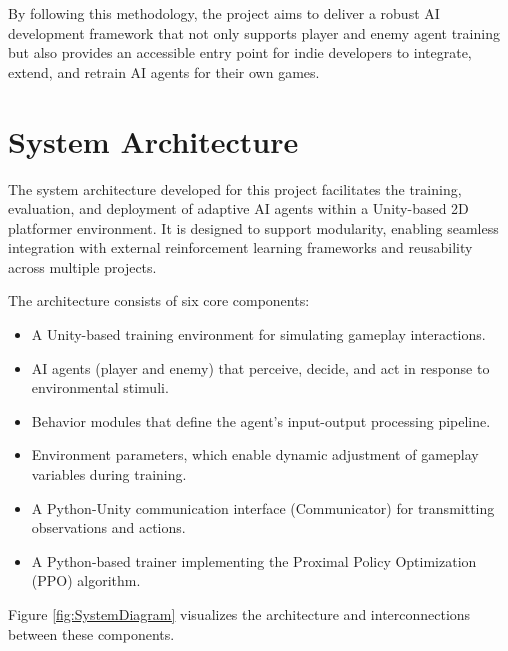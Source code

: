 \documentclass[12pt,oneside,openright,a4paper]{cpe-english-project}
\begin{document}
By following this methodology, the project aims to deliver a robust AI development framework that not only supports player and enemy agent training but also provides an accessible entry point for indie developers to integrate, extend, and retrain AI agents for their own games.\par

\section{System Architecture}

The system architecture developed for this project facilitates the training, evaluation, and deployment of adaptive AI agents within a Unity-based 2D platformer environment. It is designed to support modularity, enabling seamless integration with external reinforcement learning frameworks and reusability across multiple projects.\par

The architecture consists of six core components:

\begin{itemize}
\item A Unity-based training environment for simulating gameplay interactions.
\item AI agents (player and enemy) that perceive, decide, and act in response to environmental stimuli.
\item Behavior modules that define the agent’s input-output processing pipeline.
\item Environment parameters, which enable dynamic adjustment of gameplay variables during training.
\item A Python-Unity communication interface (Communicator) for transmitting observations and actions.
\item A Python-based trainer implementing the Proximal Policy Optimization (PPO) algorithm.
\end{itemize}

Figure \ref{fig:SystemDiagram} visualizes the architecture and interconnections between these components.\par
\end{document}
